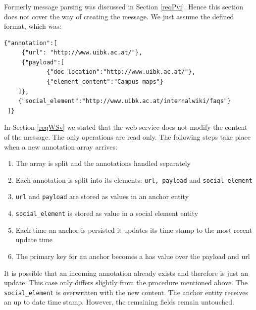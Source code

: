 \subsubsection[Message Parsing]{\reqWSvi}\label{reqWSvi}

Formerly message parsing was discussed in Section \ref{reqPvi}. Hence this section does not cover the way of creating the message. We just assume the defined format, which was:
\begin{lstlisting}
{"annotation":[
	 {"url": "http://www.uibk.ac.at/"},
	 {"payload":[
 			{"doc_location":"http://www.uibk.ac.at/"},
 			{"element_content":"Campus maps"}
 	]},
 	{"social_element":"http://www.uibk.ac.at/internalwiki/faqs"}
 ]}
\end{lstlisting}

In Section \ref{reqWSv} we stated that the web service does not modify the content of the message. The only operations are read only. The following steps take place when a new annotation array arrives:

\begin{enumerate}
	\item The array is split and the annotations handled separately 
	\item Each annotation is split into its elements: \verb^url, payload^ and \verb^social_element^
	\item \verb^url^ and \verb^payload^ are stored as values in an anchor entity
	\item \verb^social_element^ is stored as value in a social element entity
	\item Each time an anchor is persisted it updates its time stamp to the most recent update time
	\item The primary key for an anchor becomes a has value over the payload and url
\end{enumerate}

It is possible that an incoming annotation already exists and therefore is just an update. This case only differs slightly from the procedure mentioned above. The \verb^social_element^ is overwritten with the new content. The anchor entity receives an up to date time stamp. However, the remaining fields remain untouched. 


